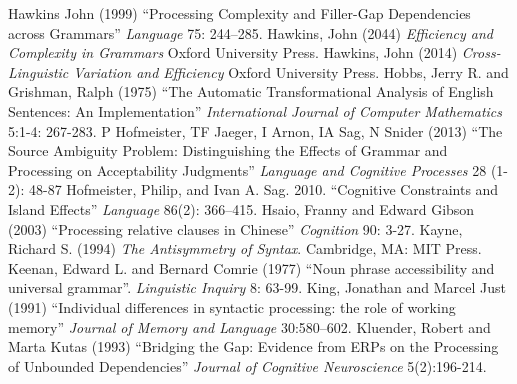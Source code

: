 \documentclass[a4paper]{article}
\begin{document}
\newline
Hawkins John (1999) ``Processing Complexity and Filler-Gap Dependencies across Grammars'' {\it Language} 75:  244–285.
\newline
\newline
Hawkins, John (2044) {\it Efficiency and Complexity in Grammars}  Oxford University Press.
\newline
\newline
Hawkins, John (2014) {\it Cross-Linguistic Variation and Efficiency}  Oxford University Press.
\newline
\newline
Hobbs, Jerry R. and Grishman, Ralph (1975) ``The Automatic Transformational Analysis of English Sentences: An Implementation''  {\it International Journal of Computer Mathematics}
5:1-4: 267-283.
\newline
\newline
P Hofmeister, TF Jaeger, I Arnon, IA Sag, N Snider (2013) ``The Source Ambiguity Problem: Distinguishing the Effects of Grammar and Processing on Acceptability Judgments''
{\it Language and Cognitive Processes} 28 (1-2): 48-87
\newline
\newline
Hofmeister, Philip, and Ivan A. Sag. 2010. ``Cognitive Constraints and Island Effects''
{\it Language}
86(2): 366–415.
\newline
\newline
Hsaio, Franny and Edward Gibson (2003) ``Processing relative clauses in Chinese'' {\it Cognition} 90: 3-27.
\newline
\newline
Kayne, Richard S. (1994) {\it The Antisymmetry of Syntax}.  Cambridge, MA:  MIT Press.
\newline
\newline
Keenan, Edward L. and Bernard Comrie (1977) ``Noun phrase accessibility and universal grammar''. {\it Linguistic Inquiry} 8: 63-99.
\newline
\newline
King, Jonathan and Marcel Just  (1991) ``Individual differences in syntactic processing: the role of working memory'' {\it Journal of Memory and Language} 30:580–602.
\newline
\newline
Kluender, Robert and Marta Kutas (1993) ``Bridging the Gap: Evidence from ERPs on the Processing of Unbounded Dependencies'' {\it Journal of Cognitive Neuroscience} 5(2):196-214.
\newline
\newline
\end{document}
